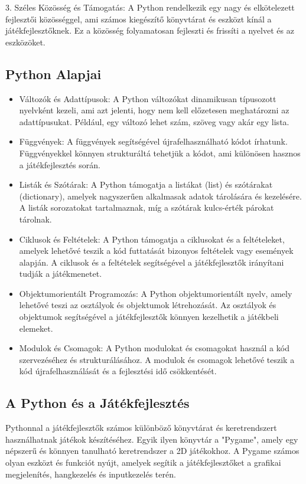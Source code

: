 3. Széles Közösség és Támogatás:
A Python rendelkezik egy nagy és elkötelezett fejlesztői közösséggel, ami számos kiegészítő könyvtárat és eszközt kínál a játékfejlesztőknek. Ez a közösség folyamatosan fejleszti és frissíti a nyelvet és az eszközöket.

\subsection{Python Alapjai}
\begin{itemize}
\item Változók és Adattípusok:
A Python változókat dinamikusan típusozott nyelvként kezeli, ami azt jelenti, hogy nem kell előzetesen meghatározni az adattípusukat. Például, egy változó lehet szám, szöveg vagy akár egy lista.

\item Függvények:
A függvények segítségével újrafelhasználható kódot írhatunk. Függvényekkel könnyen strukturáltá tehetjük a kódot, ami különösen hasznos a játékfejlesztés során.

\item Listák és Szótárak:
A Python támogatja a listákat (list) és szótárakat (dictionary), amelyek nagyszerűen alkalmasak adatok tárolására és kezelésére. A listák sorozatokat tartalmaznak, míg a szótárak kulcs-érték párokat tárolnak.

\item Ciklusok és Feltételek:
A Python támogatja a ciklusokat és a feltételeket, amelyek lehetővé teszik a kód futtatását bizonyos feltételek vagy események alapján. A ciklusok és a feltételek segítségével a játékfejlesztők irányítani tudják a játékmenetet.

\item Objektumorientált Programozás:
A Python objektumorientált nyelv, amely lehetővé teszi az osztályok és objektumok létrehozását. Az osztályok és objektumok segítségével a játékfejlesztők könnyen kezelhetik a játékbeli elemeket.

\item Modulok és Csomagok:
A Python modulokat és csomagokat használ a kód szervezéséhez és strukturálásához. A modulok és csomagok lehetővé teszik a kód újrafelhasználását és a fejlesztési idő csökkentését.

\end{itemize}

\subsection{A Python és a Játékfejlesztés}
Pythonnal a játékfejlesztők számos különböző könyvtárat és keretrendszert használhatnak játékok készítéséhez. Egyik ilyen könyvtár a "Pygame", amely egy népszerű és könnyen tanulható keretrendszer a 2D játékokhoz. A Pygame számos olyan eszközt és funkciót nyújt, amelyek segítik a játékfejlesztőket a grafikai megjelenítés, hangkezelés és inputkezelés terén.


